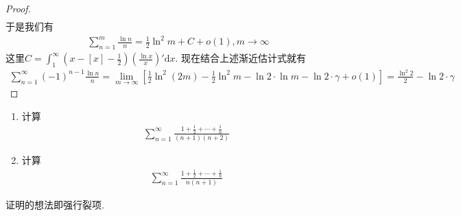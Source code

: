 \documentclass[../../main.tex]{subfiles}
\begin{document}
\begin{proof}
\begin{align*}
\end{align*}
于是我们有
\begin{align*}
\sum_{n=1}^{m} \frac{\ln n}{n} = \frac{1}{2} \ln^2 m + C + o(1), m \to \infty
\end{align*}
这里$C = \int_{1}^{\infty} \left( x - [x] - \frac{1}{2} \right) \left( \frac{\ln x}{x} \right)' \mathrm{d}x$. 现在结合上述渐近估计式就有
\begin{align*}
\sum_{n=1}^{\infty} (-1)^{n - 1} \frac{\ln n}{n} = \lim_{m \to \infty} \left[ \frac{1}{2} \ln^2 (2m) - \frac{1}{2} \ln^2 m - \ln 2 \cdot \ln m - \ln 2 \cdot \gamma + o(1) \right] = \frac{\ln^2 2}{2} - \ln 2 \cdot \gamma
\end{align*}

\end{proof}

\begin{example}
\begin{enumerate}
\item 计算
\begin{align*}
\sum_{n=1}^{\infty} \frac{1 + \frac{1}{2} + \cdots + \frac{1}{n}}{(n + 1)(n + 2)}
\end{align*}

\item 计算
\begin{align*}
\sum_{n=1}^{\infty} \frac{1 + \frac{1}{2} + \cdots + \frac{1}{n}}{n(n + 1)}
\end{align*}
\end{enumerate}
\end{example}
\begin{note}
证明的想法即强行裂项.
\end{note}
\end{document}
